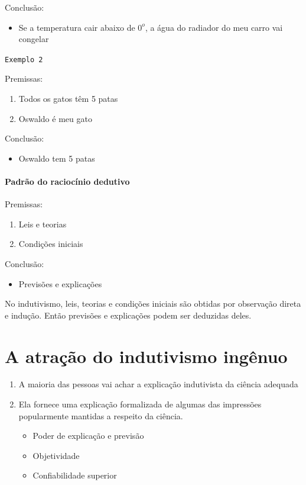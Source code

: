 \documentclass[9pt,a4paper]{extarticle}
\newcommand{\impt}[1]{\textcolor{important}{#1}}
\begin{document}
Conclusão:
\begin{itemize}
    \item Se a temperatura cair abaixo de $0^o$, a água do radiador do meu carro vai congelar
\end{itemize}


\texttt{Exemplo 2}

Premissas: 
\begin{enumerate}
    \item Todos os gatos têm 5 patas
    \item Oswaldo é meu gato 
\end{enumerate}

Conclusão:
\begin{itemize}
    \item Oswaldo tem 5 patas
\end{itemize}

\paragraph{Padrão do raciocínio dedutivo}

Premissas: 
\begin{enumerate}
    \item Leis e teorias
    \item Condições iniciais 
\end{enumerate}

Conclusão:
\begin{itemize}
    \item Previsões e explicações
\end{itemize}

\impt{No indutivismo, leis, teorias e condições iniciais são obtidas por observação direta e indução. Então previsões e explicações podem ser deduzidas deles.}

\section{A atração do indutivismo ingênuo}

\begin{enumerate}
    \item A maioria das pessoas vai achar a explicação indutivista da ciência adequada
    \item Ela fornece uma explicação formalizada de algumas das impressões popularmente mantidas a respeito da ciência.
    \begin{itemize}
        \item Poder de explicação e previsão
        \item Objetividade 
        \item Confiabilidade superior
    \end{itemize}
\end{enumerate}
\end{document}
